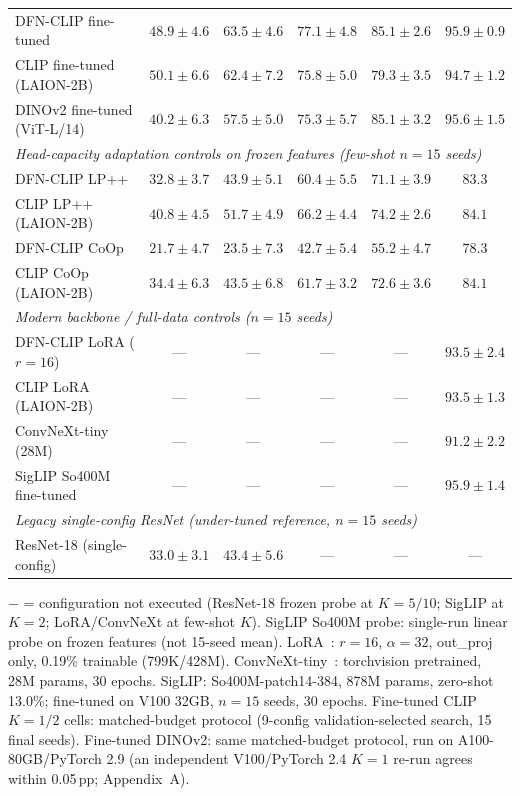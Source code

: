 \documentclass[10pt,a4paper]{article}
\begin{document}
\begin{table}[!ht]
\begin{tabular}{lccccc}
DFN-CLIP fine-tuned     & $48.9 \pm 4.6$ & $63.5 \pm 4.6$ & $77.1 \pm 4.8$ & $85.1 \pm 2.6$ & $95.9 \pm 0.9$ \\
CLIP fine-tuned (LAION-2B) & $50.1 \pm 6.6$ & $62.4 \pm 7.2$ & $75.8 \pm 5.0$ & $79.3 \pm 3.5$ & $94.7 \pm 1.2$ \\
DINOv2 fine-tuned (ViT-L/14) & $40.2 \pm 6.3$ & $57.5 \pm 5.0$ & $75.3 \pm 5.7$ & $85.1 \pm 3.2$ & $95.6 \pm 1.5$ \\
\midrule
\multicolumn{6}{l}{\emph{Head-capacity adaptation controls on frozen features (few-shot $n{=}15$ seeds)}} \\
\midrule
DFN-CLIP LP++           & $32.8 \pm 3.7$ & $43.9 \pm 5.1$ & $60.4 \pm 5.5$ & $71.1 \pm 3.9$ & $83.3$ \\
CLIP LP++ (LAION-2B)    & $40.8 \pm 4.5$ & $51.7 \pm 4.9$ & $66.2 \pm 4.4$ & $74.2 \pm 2.6$ & $84.1$ \\
DFN-CLIP CoOp           & $21.7 \pm 4.7$ & $23.5 \pm 7.3$ & $42.7 \pm 5.4$ & $55.2 \pm 4.7$ & $78.3$ \\
CLIP CoOp (LAION-2B)    & $34.4 \pm 6.3$ & $43.5 \pm 6.8$ & $61.7 \pm 3.2$ & $72.6 \pm 3.6$ & $84.1$ \\
\midrule
\multicolumn{6}{l}{\emph{Modern backbone / full-data controls ($n{=}15$ seeds)}} \\
\midrule
DFN-CLIP LoRA ($r{=}16$) & --- & --- & --- & --- & $93.5 \pm 2.4$ \\
CLIP LoRA (LAION-2B)     & --- & --- & --- & --- & $93.5 \pm 1.3$ \\
ConvNeXt-tiny (28M)      & --- & --- & --- & --- & $91.2 \pm 2.2$ \\
SigLIP So400M fine-tuned & --- & --- & --- & --- & $95.9 \pm 1.4$ \\
\midrule
\multicolumn{6}{l}{\emph{Legacy single-config ResNet (under-tuned reference, $n{=}15$ seeds)}} \\
\midrule
ResNet-18 (single-config) & $33.0 \pm 3.1$ & $43.4 \pm 5.6$ & --- & --- & --- \\
\bottomrule
\end{tabular}
\smallskip
{\small $-$ = configuration not executed (ResNet-18 frozen probe at $K{=}5/10$; SigLIP at $K{=}2$; LoRA/ConvNeXt at few-shot $K$). SigLIP So400M probe: single-run linear probe on frozen features (not 15-seed mean). LoRA~\cite{hu2022lora}: $r{=}16$, $\alpha{=}32$, out\_proj only, 0.19\% trainable (799K/428M). ConvNeXt-tiny~\cite{liu2022convnext}: torchvision pretrained, 28M params, 30 epochs. SigLIP: So400M-patch14-384, 878M params, zero-shot 13.0\%; fine-tuned on V100 32GB, $n{=}15$ seeds, 30 epochs. Fine-tuned CLIP $K{=}1/2$ cells: matched-budget protocol (9-config validation-selected search, 15 final seeds). Fine-tuned DINOv2: same matched-budget protocol, run on A100-80GB/PyTorch 2.9 (an independent V100/PyTorch 2.4 $K{=}1$ re-run agrees within 0.05\,pp; Appendix~A).}
\end{table}
\end{document}
